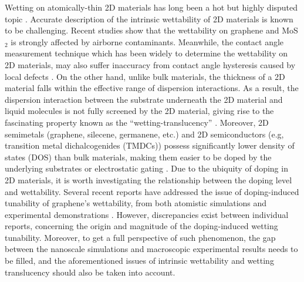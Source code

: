 \documentclass[journal=ancac3,manuscript=article,email=true]{achemso}
\begin{document}
Wetting on atomically-thin 2D materials has long been a hot but highly
disputed topic
\cite{taherian2013what,Kozbial_2015,Parobek_2015,Govind_Rajan_2016}.
Accurate description of the intrinsic wettability of 2D materials is
known to be challenging. Recent studies show that the wettability on
graphene \cite{li_effect_2013,Xu_2013_withwhat,kozbial_study_2014} and
MoS\(_{\text{2}}\) \cite{Kozbial_2015,Chow_2015} is strongly affected by airborne
contaminants. Meanwhile, the contact angle measurement technique which
has been widely to determine the wettability on 2D materials, may also
suffer inaccuracy from contact angle hysteresis caused by local
defects \cite{raj_wettability_2013}.  On the other hand, unlike bulk
materials, the thickness of a 2D material falls within the effective
range of dispersion interactions.  As a result, the dispersion
interaction between the substrate underneath the 2D material and
liquid molecules is not fully screened by the 2D material, giving rise
to the fascinating property known as the ``wetting-translucency''
\cite{rafiee_wetting_2012,shih_breakdown_2012,shih_wetting_2013}.
Moreover, 2D semimetals (graphene, silecene, germanene, etc.) and 2D
semiconductors (e.g, transition metal dichalcogenides (TMDCs)) possess
significantly lower density of states (DOS) than bulk materials,
making them easier to be doped by the underlying substrates
\cite{Chen_2013,Varchon_2007,Giovannetti_2008} or electrostatic gating
\cite{Das_2008,Perera_2013}. Due to the ubiquity of doping in 2D
materials, it is worth investigating the relationship between the
doping level and wettability. Several recent reports have addressed
the issue of doping-induced tunability of graphene's wettability, from
both atomistic simulations
\cite{ostrowski_tunable_2014,ren_interfacial_2015,Taherian_2015,daub_electrowetting_2007}
and experimental demonstrations
\cite{hong_mechanism_2016,goniszewski_correlation_2016,ashraf_doping-induced_2016}.
However, discrepancies exist between individual reports, concerning
the origin and magnitude of the doping-induced wetting
tunability. Moreover, to get a full perspective of such phenomenon,
the gap between the nanoscale simulations and macroscopic experimental
results needs to be filled, and the aforementioned issues of intrinsic
wettability and wetting translucency should also be taken into account.
\end{document}
